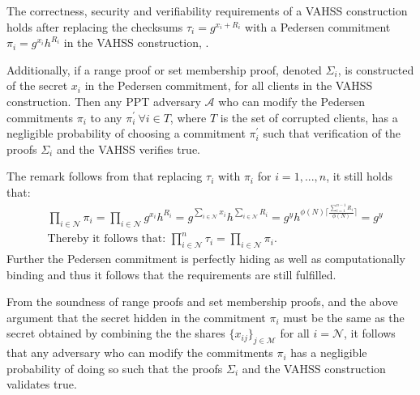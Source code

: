 \begin{Remark}
\label{thm:VAHSS_RP_CSV}
\vspace{10pt}
The correctness, security and verifiability requirements of a VAHSS construction holds after replacing the checksums $\tau_i= g^{x_i+R_i}$ with a Pedersen commitment $\pi_i= g^{x_i}h^{R_i}$ in the VAHSS construction, \cite{SumItUp}. 

Additionally, if a range proof or set membership proof, denoted $\Sigma_i$, is constructed of the secret $x_i$ in the Pedersen commitment, for all clients in the VAHSS construction.  Then any PPT adversary $\mathcal{A}$ who can modify the Pedersen commitments $\pi_i$  to any $\pi_i^{'} \:\forall  i\in T$, where $T$ is the set of corrupted clients,  has a negligible probability of choosing a commitment $\pi_i^{'}$ such that verification of the proofs $\Sigma_i$ and the VAHSS verifies true.
\end{Remark}
The remark follows from that  replacing  $\tau_i$ with $\pi_i$ for $i=1,...,n$, it still holds that:
\begin{align*}
&\prod_{i\in\mathcal{N}} \pi_i = \prod_{i\in\mathcal{N}} g^{x_i}h^{R_i} = g^{\sum_{i\in\mathcal{N}} x_i}h^{\sum_{i\in\mathcal{N}} R_i} = g^{y} h^{ \phi(N)\big\lceil \frac{\sum_{i=1}^{n-1}R_i}{\phi(N) }\big\rceil} = g^y \\
&\text{Thereby it follows that: } \prod_{i\in\mathcal{N}}^n \tau_i = \prod_{i\in\mathcal{N}} \pi_i.
\end{align*}
Further the Pedersen commitment is perfectly hiding as well as computationally binding and thus it follows that the requirements are still fulfilled. 

From the soundness of range proofs and set membership proofs, and the above argument that the secret hidden in the commitment $\pi_i$ must be the same as the secret obtained by combining the the shares $\{x_{ij}\}_{j\in\mathcal{M}}$ for all $i=\mathcal{N}$, it follows that any adversary who can modify the commitments $\pi_i$ has a negligible probability of doing so such that the proofs $\Sigma_i$ and the VAHSS construction validates true.

